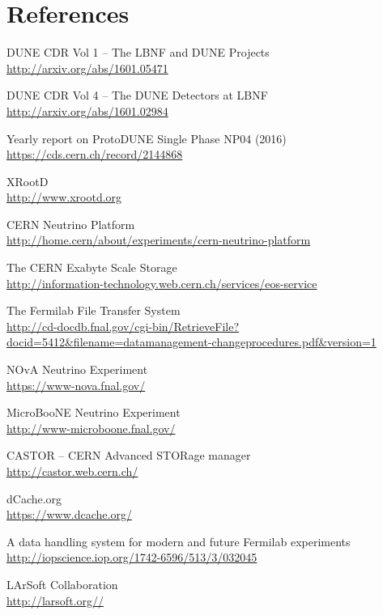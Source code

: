 \documentclass[a4paper]{jpconf}
\begin{document}
\section*{References}
\begin{thebibliography}{9}

 DUNE CDR Vol 1 -- The LBNF and DUNE Projects\\
\url{http://arxiv.org/abs/1601.05471}

 DUNE CDR Vol 4 -- The DUNE Detectors at LBNF\\
\url{http://arxiv.org/abs/1601.02984}

Yearly report on ProtoDUNE Single Phase NP04 (2016)\\
\url{https://cds.cern.ch/record/2144868}

{XRootD}\\
\url{http://www.xrootd.org}

{CERN Neutrino Platform}\\
\url{http://home.cern/about/experiments/cern-neutrino-platform}


{The CERN Exabyte Scale Storage}\\
\url{http://information-technology.web.cern.ch/services/eos-service}

{The Fermilab File Transfer System}\\
\url{http://cd-docdb.fnal.gov/cgi-bin/RetrieveFile?docid=5412&filename=datamanagement-changeprocedures.pdf&version=1}

NOvA Neutrino Experiment\\
\url{https://www-nova.fnal.gov/}

MicroBooNE Neutrino Experiment\\
\url{http://www-microboone.fnal.gov/}

{CASTOR -- CERN Advanced STORage manager}\\
\url{http://castor.web.cern.ch/}

{dCache.org}\\
\url{https://www.dcache.org/}

{A data handling system for modern and future Fermilab experiments}\\
\url{http://iopscience.iop.org/1742-6596/513/3/032045}

{LArSoft Collaboration}\\
\url{http://larsoft.org//}

\end{thebibliography}
\end{document}
